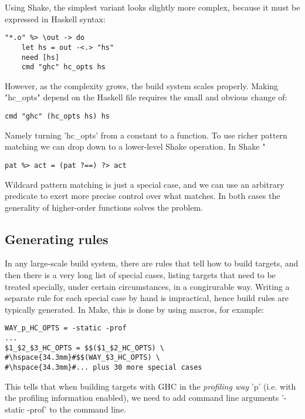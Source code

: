 \noindent Using Shake, the simplest variant looks slightly more complex, because
it must be expressed in Haskell syntax:

\begin{lstlisting}
"*.o" %> \out -> do
    let hs = out -<.> "hs"
    need [hs]
    cmd "ghc" hc_opts hs
\end{lstlisting}
\noindent
However, as the complexity grows, the build system scales properly. Making
\lst"hc_opts" depend on the Haskell file requires the small and obvious change of:

\begin{lstlisting}
cmd "ghc" (hc_opts hs) hs
\end{lstlisting}

\noindent Namely turning \lst'hc_opts' from a constant to a function. To use richer pattern matching we can drop down to a lower-level Shake operation. In Shake \lst"%

\begin{lstlisting}
pat %> act = (pat ?==) ?> act
\end{lstlisting}
\noindent
Wildcard pattern matching is just a special case, and we can use an
arbitrary predicate to exert more precise control over what matches.
In both cases the generality of higher-order functions solves the problem.

\subsection{Generating rules}

In any large-scale build system, there are rules that tell how to build targets,
and then there is a very long list of special cases, listing targets that need
to be treated specially, under certain circumstances, in a congirurable way.
Writing a separate rule for each special case by hand is impractical, hence
build rules are typically generated. In Make, this is done by using macros, for
example:

\begin{lstlisting}
WAY_p_HC_OPTS = -static -prof
...
$1_$2_$3_HC_OPTS = $$($1_$2_HC_OPTS) \
#\hspace{34.3mm}#$$(WAY_$3_HC_OPTS) \
#\hspace{34.3mm}#... plus 30 more special cases
\end{lstlisting}

This tells that when building targets with GHC in the \emph{profiling way}
\lst'p' (i.e. with the profiling information enabled), we need to add command
line arguments \lst'-static -prof' to the command line.


